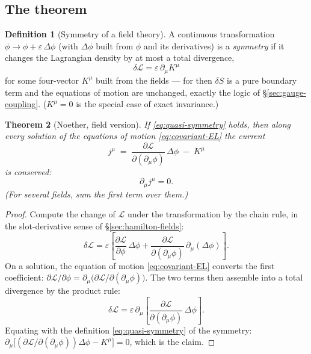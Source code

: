 \documentclass[11pt]{article}
\theoremstyle{plain}
\newtheorem{theorem}{Theorem}[section]
\theoremstyle{definition}
\newtheorem{definition}[theorem]{Definition}
\theoremstyle{remark}
\newcommand{\pd}[2]{\frac{\partial #1}{\partial #2}}
\begin{document}
\subsection{The theorem}
\label{sec:noether-theorem-fields}

\begin{definition}[Symmetry of a field theory]
A continuous transformation
$\phi \to \phi + \varepsilon\,\Delta\phi$ (with $\Delta\phi$ built
from $\phi$ and its derivatives) is a \emph{symmetry} if it changes
the Lagrangian density by at most a total divergence,
\begin{equation}
  \delta\mathcal L
  = \varepsilon\,\partial_\mu K^\mu
  \label{eq:quasi-symmetry}
\end{equation}
for some four-vector $K^\mu$ built from the fields --- for then
$\delta S$ is a pure boundary term and the equations of motion are
unchanged, exactly the logic of \S\ref{sec:gauge-coupling}. ($K^\mu = 0$
is the special case of exact invariance.)
\end{definition}

\begin{theorem}[Noether, field version]\label{thm:noether-fields}
If \eqref{eq:quasi-symmetry} holds, then along every solution of the
equations of motion \eqref{eq:covariant-EL} the current
\begin{equation}
  \boxed{\;
  j^\mu
  \;=\;
  \pd{\mathcal L}{(\partial_\mu\phi)}\,\Delta\phi
  \;-\; K^\mu
  \;}
  \label{eq:noether-current}
\end{equation}
is conserved:
\begin{equation}
  \boxed{\;\partial_\mu j^\mu = 0 .\;}
\end{equation}
(For several fields, sum the first term over them.)
\end{theorem}

\begin{proof}
Compute the change of $\mathcal L$ under the transformation by the
chain rule, in the slot-derivative sense of
\S\ref{sec:hamilton-fields}:
\begin{equation}
  \delta\mathcal L
  = \varepsilon\left[
    \pd{\mathcal L}{\phi}\,\Delta\phi
    + \pd{\mathcal L}{(\partial_\mu\phi)}\,
      \partial_\mu(\Delta\phi)
  \right].
\end{equation}
On a solution, the equation of motion \eqref{eq:covariant-EL} converts
the first coefficient:
$\partial\mathcal L/\partial\phi
= \partial_\mu\bigl(\partial\mathcal L/\partial(\partial_\mu\phi)\bigr)$.
The two terms then assemble into a total divergence by the product
rule:
\begin{equation}
  \delta\mathcal L
  = \varepsilon\,\partial_\mu\!\left[
    \pd{\mathcal L}{(\partial_\mu\phi)}\,\Delta\phi
  \right].
\end{equation}
Equating with the definition \eqref{eq:quasi-symmetry} of the
symmetry:
$\partial_\mu\bigl[
(\partial\mathcal L/\partial(\partial_\mu\phi))\Delta\phi - K^\mu
\bigr] = 0$, which is the claim.
\end{proof}
\end{document}
